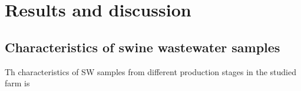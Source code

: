 \section{Results and discussion}
\subsection{Characteristics of swine wastewater samples}
Th characteristics of SW samples from different production stages in the studied farm is 
